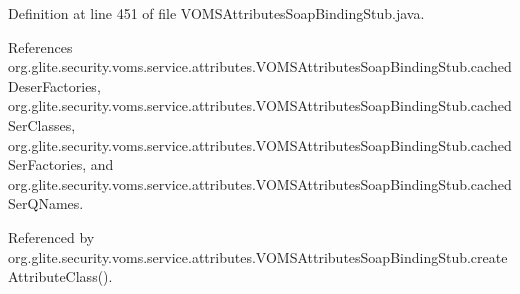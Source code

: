 \label{classorg_1_1glite_1_1security_1_1voms_1_1service_1_1attributes_1_1VOMSAttributesSoapBindingStub_ae3360b55800beccdcd7f8022facc0256}


Definition at line 451 of file VOMSAttributesSoapBindingStub.java.



References org.glite.security.voms.service.attributes.VOMSAttributesSoapBindingStub.cachedDeserFactories, org.glite.security.voms.service.attributes.VOMSAttributesSoapBindingStub.cachedSerClasses, org.glite.security.voms.service.attributes.VOMSAttributesSoapBindingStub.cachedSerFactories, and org.glite.security.voms.service.attributes.VOMSAttributesSoapBindingStub.cachedSerQNames.



Referenced by org.glite.security.voms.service.attributes.VOMSAttributesSoapBindingStub.createAttributeClass().


